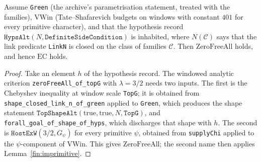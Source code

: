\begin{theorem}\label{fin:every-green}
Assume \texttt{Green} (the archive's parametrisation statement, treated with the
families), $\mathrm{VWin}$ (Tate--Shafarevich budgets on windows with constant
$401$ for every primitive character), and that the hypothesis record
$\texttt{HypsAlt}(N,\texttt{DefiniteSideCondition})$ is inhabited, where
$N(\mathcal C)$ says that the link predicate \texttt{LinkN} is closed on the
class of families $\mathcal C$. Then $\mathrm{ZeroFreeAll}$ holds, and hence
$\mathrm{EC}$ holds.
\end{theorem}
\begin{proof}
Take an element $h$ of the hypothesis record. The windowed analytic criterion
\texttt{zeroFreeAll\_of\_topG} with $\lambda=3/2$ needs two inputs. The first is
the Chebyshev inequality at window scale \texttt{TopG}; it is obtained from
\texttt{shape\_closed\_link\_n\_of\_green} applied to \texttt{Green}, which
produces the shape statement $\texttt{TopShapeAlt}(\text{true},\text{true},N,\texttt{TopG})$,
and \texttt{forall\_goal\_of\_shape\_of\_hyps}, which discharges that shape with
$h$. The second is $\texttt{HostExW}(3/2,G_{\psi})$ for every primitive $\psi$,
obtained from \texttt{supplyChi} applied to the $\psi$-component of
$\mathrm{VWin}$. This gives $\mathrm{ZeroFreeAll}$; the second name then applies
Lemma~\ref{fin:imprimitive}.
\end{proof}

